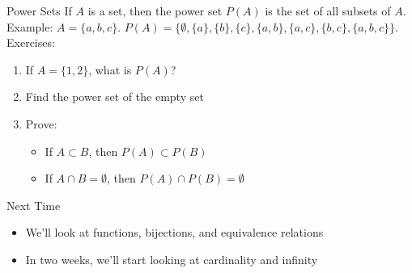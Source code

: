 \documentclass{beamer}
\begin{document}
\begin{frame}{Power Sets}
If $A$ is a set, then the power set $P(A)$ is the set of all subsets of $A$.
\\\vspace{10pt}
Example: $A = \{a,b,c\}$. $P(A) = \{\emptyset, \{a\}, \{b\}, \{c\}, \{a,b\}, \{a,c\}, \{b,c\}, \{a,b,c\}\}$.
\\\vspace{10pt}
Exercises:
\begin{enumerate}
\item If $A = \{1,2\}$, what is $P(A)$?
\item Find the power set of the empty set
\item Prove:
\begin{itemize}
\item If $A\subset B$, then $P(A)\subset P(B)$
\item If $A\cap B = \emptyset$, then $P(A)\cap P(B) = \emptyset$
\end{itemize}
\end{enumerate}
\end{frame}

\begin{frame}{Next Time}
\begin{itemize}
\item We'll look at functions, bijections, and equivalence relations
\item In two weeks, we'll start looking at cardinality and infinity
\end{itemize}
\end{frame}
\end{document}
